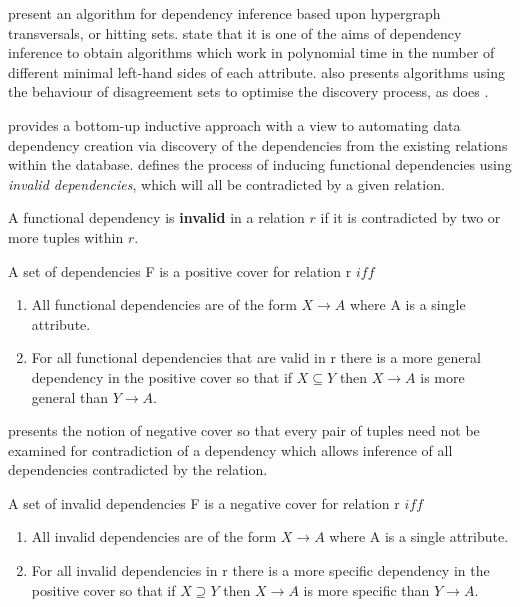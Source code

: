 \cite{mr92} present an algorithm for dependency inference based upon
hypergraph transversals, or hitting sets. \cite{mr92} state that it is one of the aims of dependency inference to
obtain algorithms which work in polynomial time in the number of 
different minimal left-hand sides of each attribute. \cite{bmt89,Mann92}
also presents algorithms using the behaviour of disagreement sets to
optimise the discovery process, as does \cite{sf93}.

\cite{sf93} provides a bottom-up inductive approach with a view to automating data dependency creation via discovery of the dependencies from the existing relations within the database.  \cite{sf93} defines the process of inducing functional dependencies using {\em invalid dependencies}, which will all be contradicted by a given relation.

\begin{definition}
\begin{rm}
A functional dependency is {\bf invalid} in a relation $r$
if it is contradicted by two or more tuples within $r$.
\end{rm}
\end{definition}

\begin{definition}
\begin{rm}
A set of dependencies F is a positive cover for relation r $iff$
\begin{enumerate}
\item All functional dependencies are of the form $X \rightarrow A$ where A is
a single attribute.
\item For all functional dependencies that are valid in r there is a
more general dependency in the positive cover so that if $X \subseteq
Y$ then $X \rightarrow A$ is more general than $Y \rightarrow A$.
\end{enumerate}
\end{rm}
\end{definition}


\cite{sf93} presents the notion of negative cover so that every pair
of tuples need not be examined for contradiction of a dependency which
allows inference of all dependencies contradicted by the relation.

\begin{definition}
\begin{rm}
A set of invalid dependencies F is a negative cover for relation r $iff$
\begin{enumerate}
\item All invalid dependencies are of the form $X \rightarrow A$ where A is
a single attribute.
\item For all invalid dependencies in r there is a more specific
dependency in the positive cover so that if $X \supseteq Y$ then $X \rightarrow A$ is
more specific than $Y \rightarrow A$.
\end{enumerate}
\end{rm}
\end{definition}


